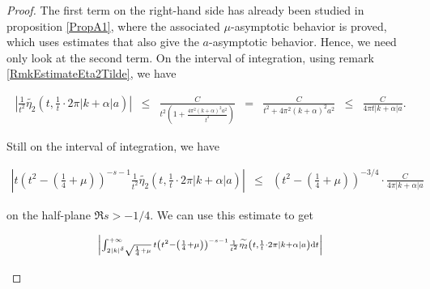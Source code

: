 \documentclass{jams-l}
\theoremstyle{definition}
\theoremstyle{remark}
\numberwithin{equation}{section}
\begin{document}
\begin{proof}
                    \noindent The first term on the right-hand side has already been studied in proposition \ref{PropA1}, where the associated $\mu$-asymptotic behavior is proved, which uses estimates that also give the $a$-asymptotic behavior. Hence, we need only look at the second term. On the interval of integration, using remark \ref{RmkEstimateEta2Tilde}, we have
                    
                    \[ \begin{array}{lllllll}
                            \scriptstyle \left \vert \frac{1}{t^2} \widetilde{\eta_2} \left( t, \frac{1}{t} \cdot 2 \pi \left \vert k + \alpha \right \vert a \right) \right \vert & \scriptstyle \leqslant & \scriptstyle \frac{C}{t^2 \left( 1 + \frac{4 \pi^2 \left( k + \alpha \right)^2 a^2}{t^2} \right)} & \scriptstyle = & \scriptstyle \frac{C}{t^2 + 4 \pi^2 \left( k + \alpha \right)^2 a^2} & \scriptstyle \leqslant & \scriptstyle \frac{C}{4 \pi t \left \vert k + \alpha \right \vert a}.
                        \end{array} \]
                    
                    \noindent Still on the interval of integration, we have
                    
                    \[ \begin{array}{lll}
                            \scriptstyle \left \vert t \left( t^2 - \left( \frac{1}{4} + \mu \right) \right)^{-s-1} \frac{1}{t^2} \widetilde{\eta_2} \left( t, \frac{1}{t} \cdot 2 \pi \left \vert k + \alpha \right \vert a \right) \right \vert & \leqslant & \scriptstyle \left( t^2 - \left( \frac{1}{4} + \mu \right) \right)^{-3/4} \cdot \frac{C}{4 \pi \left \vert k + \alpha \right \vert a}
                        \end{array} \]
                    
                    \noindent on the half-plane $\Re s > -1/4$.  We can use this estimate to get
                    
                    \[ \begin{array}{lll}
                            \multicolumn{3}{l}{\scriptstyle \left \vert \int_{2 \left \vert k \right \vert^{\delta} \sqrt{\frac{1}{4} + \mu}}^{+ \infty} t \left( t^2 - \left( \frac{1}{4} + \mu \right) \right)^{-s-1} \frac{1}{t^2} \widetilde{\eta_2} \left( t, \frac{1}{t} \cdot 2 \pi \left \vert k + \alpha \right \vert a \right) \mathrm{d}t \right \vert} \\[1em]
                            

\end{array}\]
\end{proof}
\end{document}

